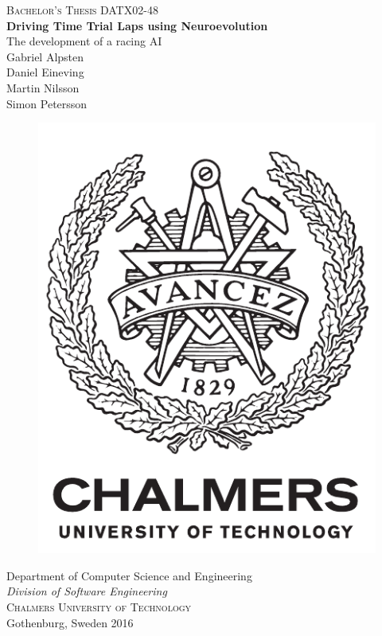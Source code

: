 \newpage
\thispagestyle{empty}
\begin{center}
	\textsc{\large Bachelor's Thesis DATX02-48 }\\[4cm]		%
	\textbf{\Large Driving Time Trial Laps using Neuroevolution} \\[1cm]
	{\large The development of a racing AI}\\[1cm]
	{\large Gabriel Alpsten}\\
	{\large Daniel Eineving}\\
	{\large Martin Nilsson}\\
	{\large Simon Petersson}
	
	\vfill	
	\begin{figure}[H]
	\centering
	\includegraphics[width=0.2\pdfpagewidth]{report/images/auxiliary/logo_eng.pdf} \\	
	\end{figure}	\vspace{5mm}	

	Department of Computer Science and Engineering \\
	\emph{Division of Software Engineering}\\
	\textsc{Chalmers University of Technology} \\
	Gothenburg, Sweden 2016 \\
\end{center}


